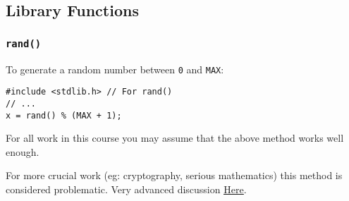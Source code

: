 \documentclass{lab}
\begin{document}
\begin{multicols}{2}
\subsection{Library Functions}
\subsubsection{\texttt{rand()}}

To generate a random number between \texttt{0} and \texttt{MAX}:

\begin{lstlisting}[style=CStyle]
#include <stdlib.h> // For rand()
// ...
x = rand() % (MAX + 1);
\end{lstlisting}

For all work in this course you may assume that the above method works well enough.

For more crucial work (eg: cryptography, serious mathematics) this method is considered problematic. Very advanced discussion \underline{\href{http://www.azillionmonkeys.com/qed/random.html}{Here}}.

\begin{lstlisting}[style=CStyle]
\end{lstlisting}


\begin{lstlisting}[style=CStyle]
\end{lstlisting}

\end{multicols}
\end{document}
